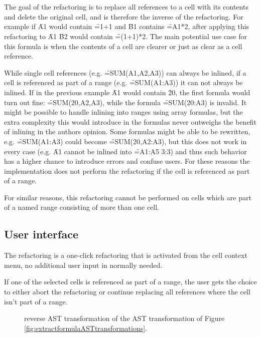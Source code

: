 \section{}
\label{refac:inlineformula}

The goal of the  refactoring is to replace all references to a cell with its contents and delete the original cell, and is therefore the inverse of the  refactoring.
For example if \f{A1} would contain \f{=1+1} and \f{B1} contains \f{=A1*2}, after applying this refactoring to \f{A1} \f{B2} would contain \f{=(1+1)*2}. 
The main potential use case for this formula is when the contents of a cell are clearer or just as clear as a cell reference.

While single cell references (e.g. \f{=SUM(A1,A2,A3)}) can always be inlined, if a cell is referenced as part of a range (e.g. \f{=SUM(A1:A3)}) it can not always be inlined.
If in the previous example \f{A1} would contain \f{20}, the first formula would turn out fine: \f{=SUM(20,A2,A3)}, while the formula \f{=SUM(20:A3)} is invalid.
It might be possible to handle inlining into ranges using array formulas, but the extra complexity this would introduce in the formulas never outweighs the benefit of inlining in the authors opinion.
Some formulas might be able to be rewritten, e.g. \f{=SUM(A1:A3)} could become \f{=SUM(20,A2:A3)}, but this does not work in every case (e.g. \f{A1} cannot be inlined into \f{=A1:A5 3:3}) and thus such behavior has a higher chance to introduce errors and confuse users.
For these reasons the implementation does not perform the refactoring if the cell is referenced as part of a range.

For similar reasons, this refactoring cannot be performed on cells which are part of a named range consisting of more than one cell.

\subsection{User interface}

The refactoring is a one-click refactoring that is activated from the cell context menu, no additional user input in normally needed.

If one of the selected cells is referenced as part of a range, the user gets the choice to either abort the refactoring or continue replacing all references where the cell isn't part of a range.

\begin{figure}
	\centering
	
	\caption{ reverse AST transformation of the  AST transformation of Figure \ref{fig:extractformulaASTtransformations}.}
	\label{fig:inlineformulaAST}
\end{figure}

